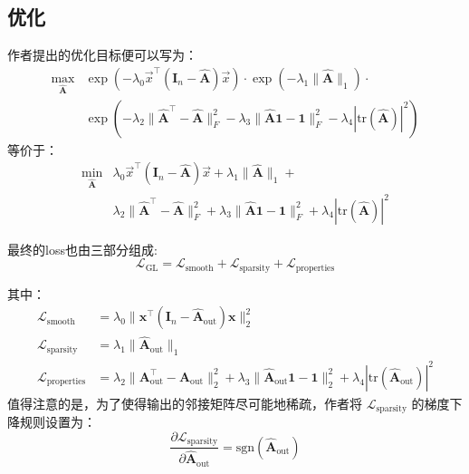\documentclass[color=gray,base=hide,cn]{elegantbook}
\begin{document}
\subsection{优化}
作者提出的优化目标便可以写为：
\begin{equation}
    \begin{aligned}
        \max_{\mathbf{\hat{A}}} & \exp\left(-\lambda_0 \vec{x}^\top(\mathbf{I}_n - \mathbf{\hat{A}}) \vec{x} \right) \cdot \exp\left( -\lambda_1 \| \mathbf{\hat{A}} \|_1 \right) \cdot \\ &  \exp \left( -\lambda_2 \| \mathbf{\hat{A}}^\top - \mathbf{\hat{A}} \|_F^2 -\lambda_3 \| \mathbf{\hat{A}}\mathbf{1} - \mathbf{1} \|_F^2 -\lambda_4 | \text{tr}(\mathbf{\hat{A}}) |^2 \right)
    \end{aligned}
\end{equation}
等价于：
\begin{equation}
    \begin{aligned}
        \min_{\mathbf{\hat{A}}} & \lambda_0 \vec{x}^\top(\mathbf{I}_n - \mathbf{\hat{A}}) \vec{x} + \lambda_1 \| \mathbf{\hat{A}} \|_1 + \\ & \lambda_2 \| \mathbf{\hat{A}}^\top - \mathbf{\hat{A}} \|_F^2  + \lambda_3 \| \mathbf{\hat{A}}\mathbf{1} - \mathbf{1} \|_F^2 + \lambda_4 | \text{tr}(\mathbf{\hat{A}}) |^2
    \end{aligned}
\end{equation}

最终的loss也由三部分组成:
\begin{equation}
    \mathcal{L}_\text{GL} = \mathcal{L}_\text{smooth} + \mathcal{L}_\text{sparsity} + \mathcal{L}_\text{properties}
\end{equation}

其中：
\begin{align}
    \mathcal{L}_\text{smooth}     & =  \lambda_0 \| \mathbf{x}^\top (\mathbf{I}_n - \mathbf{\hat{A}}_\text{out}) \mathbf{x} \|_2^2                                                                                                                  \\
    \mathcal{L}_\text{sparsity}   & =   \lambda_1 \| \mathbf{\hat{A}}_\text{out} \|_1                                                                                                                                                               \\
    \mathcal{L}_\text{properties} & =   \lambda_2 \| \mathbf{A}_\text{out}^\top - \mathbf{A}_\text{out} \|_2^2 +   \lambda_3 \| \mathbf{\hat{A}}_\text{out} \mathbf{1} - \mathbf{1} \|_2^2 + \lambda_4 | \text{tr}(\mathbf{\hat{A}}_\text{out}) |^2
\end{align}
值得注意的是，为了使得输出的邻接矩阵尽可能地稀疏，作者将 $\mathcal{L}_\text{sparsity}$ 的梯度下降规则设置为：
\begin{equation}
    \frac{\partial \mathcal{L}_\text{sparsity}}{\partial \mathbf{\hat{A}}_\text{out}} = \text{sgn}(\mathbf{\hat{A}}_\text{out})
\end{equation}
\end{document}
